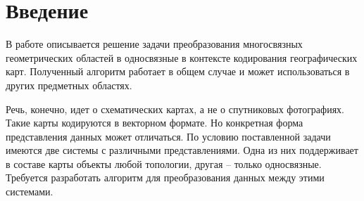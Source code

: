 \section{Введение}
\label{}

В работе описывается решение задачи преобразования многосвязных геометрических областей в односвязные в контексте кодирования географических карт. Полученный алгоритм работает в общем случае и может использоваться в других предметных областях.

Речь, конечно, идет о схематических картах, а не о спутниковых фотографиях. Такие карты кодируются в векторном формате. Но конкретная форма представления данных может отличаться. По условию поставленной задачи имеются две системы с различными представлениями. Одна из них поддерживает в составе карты объекты любой топологии, другая – только односвязные. Требуется разработать алгоритм для преобразования данных между этими системами.